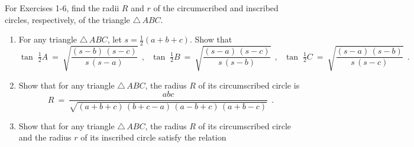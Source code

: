 \startexercises\label{sec2dot5}
\vspace{5mm}
{\small
\par\noindent For Exercises 1-6, find the radii $R$ and $r$ of the circumscribed and inscribed
circles, respectively, of the triangle $\triangle\,ABC$.
\begin{enumerate}[\bfseries 1.]
 For Exercises 7 and 8, draw the triangle $\triangle\,ABC$ and its circumscribed and inscribed
 circles accurately, using a ruler and compass (or computer software).
 [{[\bfseries 1.]}]
 \item For any triangle $\triangle\,ABC$, let $s = \frac{1}{2}(a+b+c)$. Show that
  \begin{displaymath}
   \tan\;\tfrac{1}{2}A ~=~ \sqrt{\frac{(s-b)\,(s-c)}{s\,(s-a)}} ~~,~~~
   \tan\;\tfrac{1}{2}B ~=~ \sqrt{\frac{(s-a)\,(s-c)}{s\,(s-b)}} ~~,~~~
   \tan\;\tfrac{1}{2}C ~=~ \sqrt{\frac{(s-a)\,(s-b)}{s\,(s-c)}} ~~.
  \end{displaymath}
 \item Show that for any triangle $\triangle\,ABC$, the radius $R$ of its circumscribed circle is
  \begin{displaymath}
   R ~=~ \frac{abc}{\sqrt{(a+b+c)\,(b+c-a)\,(a-b+c)\,(a+b-c)}} ~~.
  \end{displaymath}
 \item Show that for any triangle $\triangle\,ABC$, the radius $R$ of its circumscribed circle and
  the radius $r$ of its inscribed circle satisfy the relation
  \begin{displaymath}

\end{displaymath}
\end{enumerate}}
